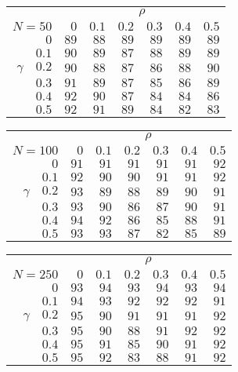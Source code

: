 \begin{tabular}{r|rrrrrr}
\hline\hline
 &\multicolumn{6}{c}{$\rho$} \\ 
 $N = 50$ & $0$ & $0.1$ & $0.2$ & $0.3$ & $0.4$ & $0.5$ \\ 
 \hline$0$ & $89$ & $88$ & $89$ & $89$ & $89$ & $89$\\ 
$0.1$ & $90$ & $89$ & $87$ & $88$ & $89$ & $89$\\ 
$\gamma\quad$$0.2$ & $90$ & $88$ & $87$ & $86$ & $88$ & $90$\\ 
$0.3$ & $91$ & $89$ & $87$ & $85$ & $86$ & $89$\\ 
$0.4$ & $92$ & $90$ & $87$ & $84$ & $84$ & $86$\\ 
$0.5$ & $92$ & $91$ & $89$ & $84$ & $82$ & $83$\\ 
 \hline 
 \end{tabular}
 
 \vspace{2em} 
 
\begin{tabular}{r|rrrrrr}
\hline\hline
 &\multicolumn{6}{c}{$\rho$} \\ 
 $N = 100$ & $0$ & $0.1$ & $0.2$ & $0.3$ & $0.4$ & $0.5$ \\ 
 \hline$0$ & $91$ & $91$ & $91$ & $91$ & $91$ & $92$\\ 
$0.1$ & $92$ & $90$ & $90$ & $91$ & $91$ & $92$\\ 
$\gamma\quad$$0.2$ & $93$ & $89$ & $88$ & $89$ & $90$ & $91$\\ 
$0.3$ & $93$ & $90$ & $86$ & $87$ & $90$ & $91$\\ 
$0.4$ & $94$ & $92$ & $86$ & $85$ & $88$ & $91$\\ 
$0.5$ & $93$ & $93$ & $87$ & $82$ & $85$ & $89$\\ 
 \hline 
 \end{tabular}
 
 \vspace{2em} 
 
\begin{tabular}{r|rrrrrr}
\hline\hline
 &\multicolumn{6}{c}{$\rho$} \\ 
 $N = 250$ & $0$ & $0.1$ & $0.2$ & $0.3$ & $0.4$ & $0.5$ \\ 
 \hline$0$ & $93$ & $94$ & $93$ & $94$ & $93$ & $94$\\ 
$0.1$ & $94$ & $93$ & $92$ & $92$ & $92$ & $91$\\ 
$\gamma\quad$$0.2$ & $95$ & $90$ & $91$ & $91$ & $91$ & $92$\\ 
$0.3$ & $95$ & $90$ & $88$ & $91$ & $92$ & $92$\\ 
$0.4$ & $95$ & $91$ & $85$ & $90$ & $91$ & $92$\\ 
$0.5$ & $95$ & $92$ & $83$ & $88$ & $91$ & $92$\\ 
 \hline 
 \end{tabular}